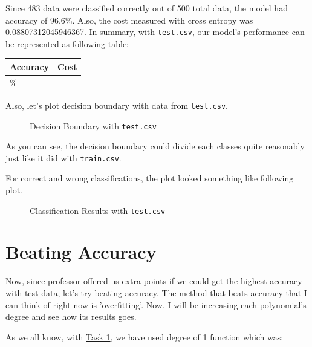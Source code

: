 \documentclass{homework}
\begin{document}
Since 483 data were classified correctly out of 500 total data, the model had accuracy of 96.6\%. Also, the cost measured with cross entropy was 0.08807312045946367. In summary, with \texttt{test.csv}, our model's performance can be represented as following table:

\begin{center}
\begin{tabularx}{0.8\textwidth} { 
  | >{\centering\arraybackslash}X 
  | >{\centering\arraybackslash}X | }
 \hline
 Accuracy & Cost \\
 \hline
 96.6\% & 0.08807312045946367\\
\hline
\end{tabularx}
\end{center}

Also, let's plot decision boundary with data from \texttt{test.csv}.

\begin{figure}[h]
    \begin{center}
        \resizebox{0.5\textwidth}{!}{}
    \end{center}
    \caption{Decision Boundary with \texttt{test.csv}}
\end{figure}

As you can see, the decision boundary could divide each classes quite reasonably just like it did with \texttt{train.csv}.

\pagebreak
For correct and wrong classifications, the plot looked something like following plot.

\begin{figure}[h]
    \begin{center}
        \resizebox{0.5\textwidth}{!}{}
    \end{center}
    \caption{Classification Results with \texttt{test.csv}}
\end{figure}

\section{Beating Accuracy}
Now, since professor offered us extra points if we could get the highest accuracy with test data, let's try beating accuracy. The method that beats accuracy that I can think of right now is 'overfitting'. Now, I will be increasing each polynomial's degree and see how its results goes.

As we all know, with \hyperref[sec:task1]{Task 1}, we have used degree of 1 function which was:
\end{document}
